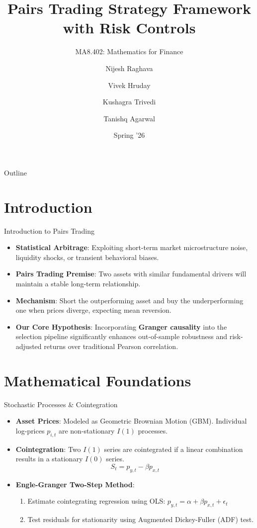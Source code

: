 \documentclass[11pt,aspectratio=169]{beamer}
\title[Pairs Trading Strategy]{Pairs Trading Strategy Framework \\ \large with Risk Controls}
\subtitle{MA8.402: Mathematics for Finance}
\author[Raghava, Hruday, Trivedi, Agarwal]{Nijesh Raghava \and Vivek Hruday \and Kushagra Trivedi \and Tanishq Agarwal}
\date{Spring '26}
\begin{document}
\begin{frame}
    \titlepage
\end{frame}

\begin{frame}{Outline}
    \tableofcontents
\end{frame}

\section{Introduction}
\begin{frame}{Introduction to Pairs Trading}
    \begin{itemize}
        \item \textbf{Statistical Arbitrage}: Exploiting short-term market microstructure noise, liquidity shocks, or transient behavioral biases.
        \vspace{0.2cm}
        \item \textbf{Pairs Trading Premise}: Two assets with similar fundamental drivers will maintain a stable long-term relationship.
        \vspace{0.2cm}
        \item \textbf{Mechanism}: Short the outperforming asset and buy the underperforming one when prices diverge, expecting mean reversion.
        \vspace{0.2cm}
        \item \textbf{Our Core Hypothesis}: Incorporating \textbf{Granger causality} into the selection pipeline significantly enhances out-of-sample robustness and risk-adjusted returns over traditional Pearson correlation.
    \end{itemize}
\end{frame}

\section{Mathematical Foundations}
\begin{frame}{Stochastic Processes \& Cointegration}
    \begin{itemize}
        \item \textbf{Asset Prices}: Modeled as Geometric Brownian Motion (GBM). Individual log-prices $p_{i,t}$ are non-stationary $I(1)$ processes.
        \item \textbf{Cointegration}: Two $I(1)$ series are cointegrated if a linear combination results in a stationary $I(0)$ series.
        \begin{equation*}
            S_t = p_{y,t} - \beta p_{x,t}
        \end{equation*}
        \item \textbf{Engle-Granger Two-Step Method}:
        \begin{enumerate}
            \item Estimate cointegrating regression using OLS: $p_{y,t} = \alpha + \beta p_{x,t} + \epsilon_t$
            \item Test residuals for stationarity using Augmented Dickey-Fuller (ADF) test.
        \end{enumerate}
    \end{itemize}
\end{frame}
\end{document}
